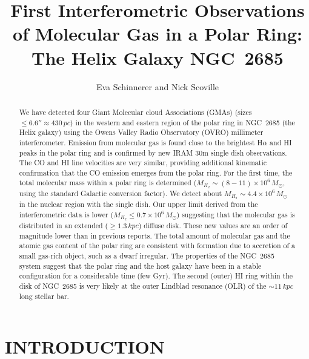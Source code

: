 \documentclass{aastex}
\newcommand{\solm}{M_{\odot}}
\begin{document}
\title{First Interferometric Observations of Molecular Gas in a Polar Ring:
The Helix Galaxy NGC~2685}


\author{Eva Schinnerer and Nick Scoville}


\begin{abstract}
We have detected four Giant Molecular cloud Associations (GMAs) (sizes
$\leq 6.6'' \approx 430\,pc$) in the western and eastern region of the
polar ring in NGC~2685 (the Helix galaxy) using the Owens Valley Radio
Observatory (OVRO) millimeter interferometer. Emission from molecular
gas is found close to the brightest H$\alpha$ and HI peaks in the
polar ring and is confirmed by new IRAM 30m single dish
observations. The CO and HI line velocities are very similar,
providing additional kinematic confirmation that the CO emission
emerges from the polar ring. For the first time, the total molecular
mass within a polar ring is determined
($M_{H_2}\sim(8-11)\times10^6\,\solm$, using the standard Galactic
conversion factor). We detect about $M_{H_2}\sim4.4\times10^6\,\solm$
in the nuclear region with the single dish. Our upper limit derived
from the interferometric data is lower
($M_{H_2}\le0.7\times10^6\,\solm$) suggesting that the molecular gas
is distributed in an extended ($\ge 1.3\,kpc$) diffuse disk. These new
values are an order of magnitude lower than in previous reports. The
total amount of molecular gas and the atomic gas content of the polar
ring are consistent with formation due to accretion of a small
gas-rich object, such as a dwarf irregular. The properties of the
NGC~2685 system suggest that the polar ring and the host galaxy have
been in a stable configuration for a considerable time (few Gyr). The
second (outer) HI ring within the disk of NGC~2685 is very likely at
the outer Lindblad resonance (OLR) of the $\sim 11\,kpc$ long stellar
bar.

\end{abstract}



\section{INTRODUCTION}
\end{document}
